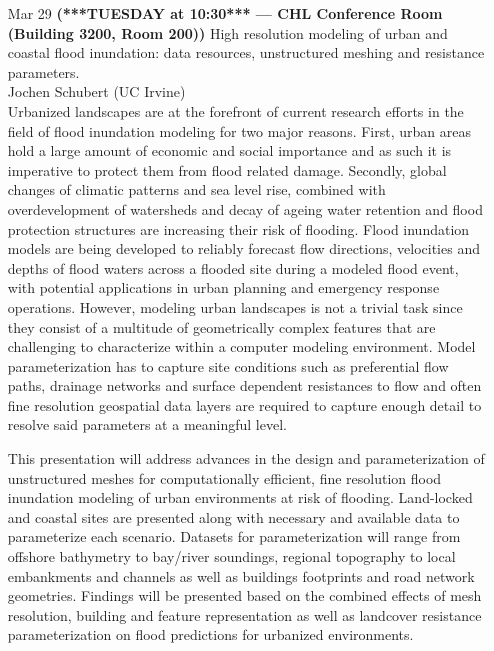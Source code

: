 \documentclass[12]{article}
\begin{document}
\begin{enumerate}
\item[Mar 29 {\bf (***TUESDAY at 10:30*** --- CHL Conference Room (Building 3200, Room 200))}]High resolution modeling of urban and coastal flood inundation:
  data resources, unstructured meshing and resistance parameters. \\ Jochen Schubert (UC Irvine) \\
  Urbanized landscapes are at the forefront of current research
  efforts in the field of flood inundation modeling for two major
  reasons. First, urban areas hold a large amount of economic and
  social importance and as such it is imperative to protect them from
  flood related damage. Secondly, global changes of climatic patterns
  and sea level rise, combined with overdevelopment of watersheds and
  decay of ageing water retention and flood protection structures are
  increasing their risk of flooding. Flood inundation models are being
  developed to reliably forecast flow directions, velocities and
  depths of flood waters across a flooded site during a modeled flood
  event, with potential applications in urban planning and emergency
  response operations. However, modeling urban landscapes is not a
  trivial task since they consist of a multitude of geometrically
  complex features that are challenging to characterize within a
  computer modeling environment. Model parameterization has to capture
  site conditions such as preferential flow paths, drainage networks
  and surface dependent resistances to flow and often fine resolution
  geospatial data layers are required to capture enough detail to
  resolve said parameters at a meaningful level.

  This presentation will address advances in the design and
  parameterization of unstructured meshes for computationally
  efficient, fine resolution flood inundation modeling of urban
  environments at risk of flooding. Land-locked and coastal sites are
  presented along with necessary and available data to parameterize
  each scenario. Datasets for parameterization will range from
  offshore bathymetry to bay/river soundings, regional topography to
  local embankments and channels as well as buildings footprints and
  road network geometries. Findings will be presented based on the
  combined effects of mesh resolution, building and feature
  representation as well as landcover resistance parameterization on
  flood predictions for urbanized environments.


\end{enumerate}
\end{document}
